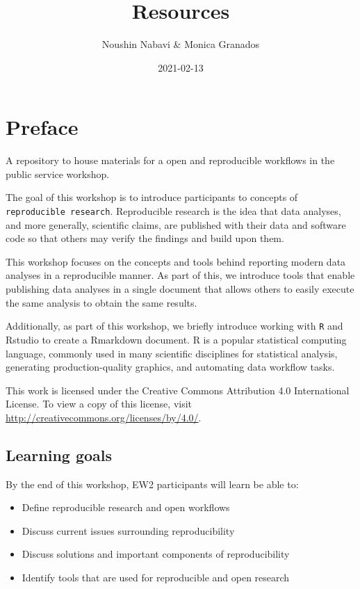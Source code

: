 \documentclass[
]{book}
\title{Resources}
\author{Noushin Nabavi \& Monica Granados}
\date{2021-02-13}
\providecommand{\tightlist}{%
  \setlength{\itemsep}{0pt}\setlength{\parskip}{0pt}}
\begin{document}
\maketitle

{
\setcounter{tocdepth}{1}
\tableofcontents
}
\hypertarget{preface}{%
\chapter{Preface}\label{preface}}

A repository to house materials for a open and reproducible workflows in the public service workshop.

The goal of this workshop is to introduce participants to concepts of \texttt{reproducible\ research}.
Reproducible research is the idea that data analyses, and more generally, scientific claims, are published with their data and software code so that others may verify the findings and build upon them.

This workshop focuses on the concepts and tools behind reporting modern data analyses in a reproducible manner. As part of this, we introduce tools that enable publishing data analyses in a single document that allows others to easily execute the same analysis to obtain the same results.

Additionally, as part of this workshop, we briefly introduce working with \texttt{R} and Rstudio to create a Rmarkdown document. R is a popular statistical computing language, commonly used in many scientific disciplines for statistical analysis, generating production-quality graphics, and automating data workflow tasks.

This work is licensed under the Creative Commons Attribution 4.0 International License.
To view a copy of this license, visit \url{http://creativecommons.org/licenses/by/4.0/}.

\hypertarget{learning-goals}{%
\section{Learning goals}\label{learning-goals}}

By the end of this workshop, EW2 participants will learn be able to:

\begin{itemize}
\tightlist
\item
  Define reproducible research and open workflows
\item
  Discuss current issues surrounding reproducibility
\item
  Discuss solutions and important components of reproducibility
\item
  Identify tools that are used for reproducible and open research
\end{itemize}
\end{document}
